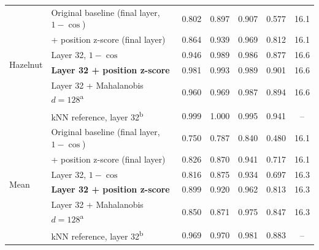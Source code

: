\begin{table}[t]
\begin{tabular}{llccccc}
\hline
\multirow{6}{*}{Hazelnut}
 & Original baseline (final layer, $1-\cos$) & 0.802 & 0.897 & 0.907 & 0.577 & 16.1 \\
 & + position z-score (final layer) & 0.864 & 0.939 & 0.969 & 0.812 & 16.1 \\
 & Layer 32, $1-\cos$ & 0.946 & 0.989 & 0.986 & 0.877 & 16.6 \\
 & \textbf{Layer 32 + position z-score} & 0.981 & 0.993 & 0.989 & 0.901 & 16.6 \\
 & Layer 32 + Mahalanobis $d{=}128$\textsuperscript{a} & 0.960 & 0.969 & 0.987 & 0.894 & 16.6 \\
 & kNN reference, layer 32\textsuperscript{b} & 0.999 & 1.000 & 0.995 & 0.941 & -- \\
\hline
\multirow{6}{*}{Mean}
 & Original baseline (final layer, $1-\cos$) & 0.750 & 0.787 & 0.840 & 0.480 & 16.1 \\
 & + position z-score (final layer) & 0.826 & 0.870 & 0.941 & 0.717 & 16.1 \\
 & Layer 32, $1-\cos$ & 0.816 & 0.875 & 0.934 & 0.697 & 16.3 \\
 & \textbf{Layer 32 + position z-score} & 0.899 & 0.920 & 0.962 & 0.813 & 16.3 \\
 & Layer 32 + Mahalanobis $d{=}128$\textsuperscript{a} & 0.850 & 0.871 & 0.975 & 0.847 & 16.3 \\
 & kNN reference, layer 32\textsuperscript{b} & 0.969 & 0.970 & 0.981 & 0.883 & -- \\
\hline
\end{tabular}
\end{table}
